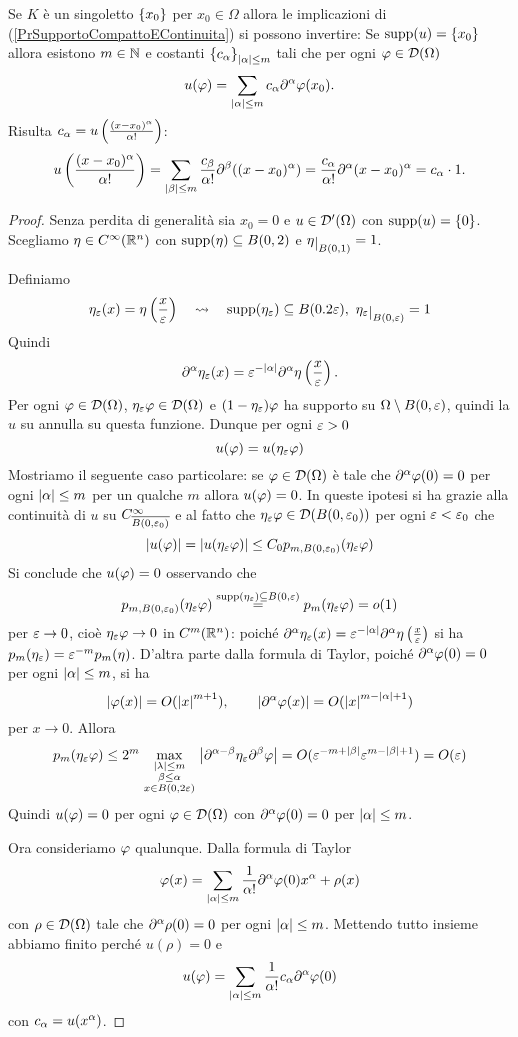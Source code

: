 \begin{example}
Se $K$ \`e un singoletto $\left\{{x_0}\right\}$ per $x_0\in \Omega$ allora le implicazioni di (\ref{PrSupportoCompattoEContinuita}) si possono invertire: Se $\operatorname{supp}(u)=\left\{{x_0}\right\}$ allora esistono $m\in \mathbb{N}$ e costanti $\left\{{c_\alpha}\right\}_{\left|{\alpha}\right|\leq m}$ tali che per ogni $\varphi\in \mathcal{D}(\Omega)$
\[u(\varphi)=\sum_{\left|{\alpha}\right|\leq m}c_\alpha\partial^\alpha \varphi(x_0).\]
Risulta $c_\alpha=u\left({\frac{(x-x_0)^\alpha}{\alpha!}}\right)$:
\[u\left({\frac{(x-x_0)^\alpha}{\alpha!}}\right)=\sum_{\left|{\beta}\right|\leq m}\frac{c_\beta}{\alpha!}\partial^\beta((x-x_0)^\alpha)=\frac{c_\alpha}{\alpha!} \partial^\alpha(x-x_0)^\alpha=c_\alpha\cdot 1.\]
\end{example}
\begin{proof}
Senza perdita di generalit\`a sia $x_0=0$ e $u\in\mathcal{D}'(\Omega)$ con $\operatorname{supp}(u)=\left\{{0}\right\}$. Scegliamo $\eta\in C^\infty(\mathbb{R}^n)$ con $\operatorname{supp}(\eta)\subseteq B(0,2)$ e $\eta\res{B(0,1)}=1$.

Definiamo
\[\eta_\e(x)=\eta\pa{\frac x\e}\quad\leadsto\quad \supp(\eta_\e)\subseteq B(0.2\e),\ \eta_\e\res{B(0,\e)}=1\]
Quindi 
\[\partial^\alpha\eta_\varepsilon(x)=\varepsilon^{-\left|{\alpha}\right|}\partial^\alpha\eta\left({\frac x{\varepsilon}}\right).\]
Per ogni $\varphi\in \mathcal{D}(\Omega)$, $\eta_\varepsilon\varphi\in \mathcal{D}(\Omega)$ e $(1-\eta_\varepsilon)\varphi$ ha supporto su $\Omega\setminus B(0,\varepsilon)$, quindi la $u$ su annulla su questa funzione. Dunque per ogni $\varepsilon>0$
\[u(\varphi)=u(\eta_\varepsilon\varphi)\]
Mostriamo il seguente caso particolare: se $\varphi\in\mathcal{D}(\Omega)$ \`e tale che $\partial^\alpha\varphi(0)=0$ per ogni $\left|{\alpha}\right|\leq m$ per un qualche $m$ allora $u(\varphi)=0$. In queste ipotesi si ha grazie alla continuit\`a di $u$ su $C^\infty_{\overline{B(0,\varepsilon_0)}}$ e al fatto che $\eta_\varepsilon\varphi\in \mathcal{D}(B(0,\varepsilon_0))$ per ogni $\varepsilon<\varepsilon_0$ che
\[\left|{u(\varphi)}\right|=\left|{u(\eta_\varepsilon\varphi)}\right|\leq C_0 p_{m,B(0,\varepsilon_0)}(\eta_\varepsilon\varphi)\]
Si conclude che $u(\varphi)=0$ osservando che 
\[p_{m,B(0,\varepsilon_0)}(\eta_\varepsilon\varphi)\overset{\operatorname{supp}(\eta_\varepsilon)\subseteq B(0,\varepsilon)}=p_{m}(\eta_\varepsilon\varphi)=o(1)\] 
per $\varepsilon\to0$, cio\`e $\eta_\varepsilon\varphi\to 0$ in $C^m(\mathbb{R}^n)$: poich\'e $\partial^\alpha\eta_\varepsilon(x)=\varepsilon^{-\left|{\alpha}\right|}\partial^\alpha \eta\left({\frac x{\varepsilon}}\right)$ si ha $p_m(\eta_\varepsilon)=\varepsilon^{-m}p_m(\eta)$. D'altra parte dalla formula di Taylor, poich\'e $\partial^\alpha\varphi(0)=0$ per ogni $\left|{\alpha}\right|\leq m$, si ha
\[\left|{\varphi(x)}\right|=O(\left|{x}\right|^{m+1}),\qquad \left|{\partial^\alpha\varphi(x)}\right|=O(\left|{x}\right|^{m-\left|{\alpha}\right|+1})\]
per $x\to 0$. Allora
\[p_m(\eta_\varepsilon\varphi)\leq 2^m \max_{\begin{smallmatrix}\left|{\lambda}\right|\leq m\\ \beta\leq\alpha\\x\in B(0,2\varepsilon)\end{smallmatrix}}\left|{\partial^{\alpha-\beta }\eta_\varepsilon\partial^\beta\varphi}\right|=O(\varepsilon^{-m+\left|{\beta}\right|}\varepsilon^{m-\left|{\beta}\right|+1})=O(\varepsilon)\]
Quindi $u(\varphi)=0$ per ogni $\varphi\in \mathcal{D}(\Omega)$ con $\partial^\alpha\varphi(0)=0$ per $\left|{\alpha}\right|\leq m$.

\bigskip

Ora consideriamo $\varphi$ qualunque. Dalla formula di Taylor
\[\varphi(x)=\sum_{\left|{\alpha}\right|\leq m}\frac1{\alpha!}\partial^\alpha\varphi(0)x^\alpha + \rho(x)\]
con $\rho\in \mathcal{D}(\Omega)$ tale che $\partial^\alpha\rho(0)=0$ per ogni $\left|{\alpha}\right|\leq m$. Mettendo tutto insieme abbiamo finito perch\'e $u(\rho)=0$ e
\[u(\varphi)=\sum_{\left|{\alpha}\right|\leq m}\frac1{\alpha!}c_\alpha\partial^\alpha\varphi(0)\]
con $c_\alpha=u(x^\alpha)$.
\end{proof}
